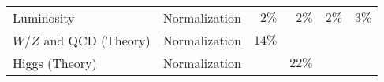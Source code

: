 \begin{table}[htpb]
\begin{tabular}{@{}llrrrr@{}}
  Luminosity                & Normalization  & $2\%$    & $2\%$  & $2\%$                             &
  $3\%$                                                                                                                                  \\
  $W$/$Z$ and QCD (Theory)  & Normalization  & $14\%$   &        &                                   &
  \\
  Higgs (Theory)            & Normalization  &          & $22\%$ &                                   &
  \\
  \bottomrule
 \end{tabular}
 \label{table:systematic_uncertainties}
\end{table}
